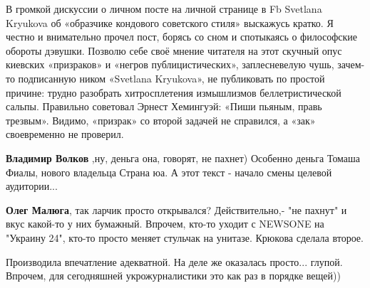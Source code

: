 \begin{itemize}
 
В громкой дискуссии о личном посте на личной странице в Fb Svetlana Kryukova об
«образчике кондового советского стиля» выскажусь кратко. Я честно и внимательно
прочел пост, борясь со сном и спотыкаясь о философские обороты дэвушки. Позволю
себе своё мнение читателя на этот скучный опус киевских «призраков» и «негров
публицистических», заплесневелую чушь, зачем-то подписанную ником «Svetlana
Kryukova», не публиковать по простой причине: трудно разобрать хитросплетения
измышлизмов беллетристической сальпы. Правильно советовал Эрнест Хемингуэй:
«Пиши пьяным, правь трезвым». Видимо, «призрак» со второй задачей не справился,
а «зак» своевременно не проверил.

\begin{itemize}
 
\textbf{Владимир Волков} ,ну, деньга она, говорят, не пахнет) Особенно деньга Томаша Фиалы, нового владельца Страна юа. А этот текст - начало смены целевой аудитории...

 
\textbf{Олег Малюга}, так ларчик просто открывался? Действительно,- "не пахнут"
и вкус какой-то у них бумажный. Впрочем, кто-то уходит с NEWSONE на "Украину
24", кто-то просто меняет стульчак на унитазе. Крюкова сделала второе.
\end{itemize}

 

Производила впечатление адекватной. На деле же оказалась просто... глупой.
Впрочем, для сегодняшней укрожурналистики это как раз в порядке вещей))


 


\end{itemize}
